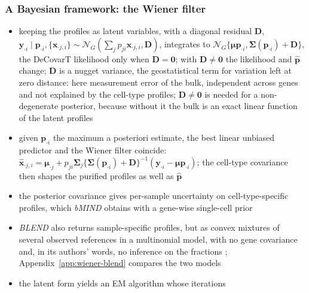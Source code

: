 \documentclass[pdflatex, sn-nature]{sn-jnl}
\theoremstyle{thmstyleone}%
\theoremstyle{thmstyletwo}%
\theoremstyle{thmstylethree}%
\begin{document}
\subsubsection{A Bayesian framework: the Wiener filter}
\label{sec:wiener}

\begin{itemize}
  \item keeping the profiles as latent variables, with a diagonal residual \(\boldsymbol{D}\),
        \(\boldsymbol{y}_{\cdot i}\mid\boldsymbol{p}_{\cdot i},\{\boldsymbol{x}_{\cdot j,i}\}\sim\mathcal{N}_{G}(\sum_{j}p_{ji}\boldsymbol{x}_{\cdot j,i},\boldsymbol{D})\),
        integrates to \(\mathcal{N}_{G}\{\boldsymbol{\mu}\boldsymbol{p}_{\cdot i},\boldsymbol{\Sigma}(\boldsymbol{p}_{\cdot i})+\boldsymbol{D}\}\), the DeCovarT likelihood only when
        \(\boldsymbol{D}=\boldsymbol{0}\); with \(\boldsymbol{D}\neq\boldsymbol{0}\) the likelihood and \(\hat{\boldsymbol{p}}\) change; \(\boldsymbol{D}\) is a nugget variance, the geostatistical term for
        variation left at zero distance: here measurement error of the bulk, independent across genes and not explained
        by the cell-type profiles; \(\boldsymbol{D}\neq\boldsymbol{0}\) is needed for a non-degenerate posterior, because without
        it the bulk is an exact linear function of the latent profiles
  \item given \(\boldsymbol{p}_{\cdot i}\) the maximum a posteriori estimate, the best linear unbiased predictor
        and the Wiener filter coincide:
        \(\hat{\boldsymbol{x}}_{\cdot j,i}=\boldsymbol{\mu}_{\cdot j}+p_{ji}\boldsymbol{\Sigma}_{j}\{\boldsymbol{\Sigma}(\boldsymbol{p}_{\cdot i})+\boldsymbol{D}\}^{-1}(\boldsymbol{y}_{\cdot i}-\boldsymbol{\mu}\boldsymbol{p}_{\cdot i})\);
        the cell-type covariance then shapes the purified profiles as well as \(\hat{\boldsymbol{p}}\)
  \item the posterior covariance gives per-sample uncertainty on cell-type-specific profiles, which
        \emph{bMIND} obtains with a gene-wise single-cell prior \cite{wangBayesianEstimationCelltypespecific2020}
  \item \emph{BLEND} also returns sample-specific profiles, but as convex mixtures of several observed references in a
        multinomial model, with no gene covariance and, in its authors' words, no inference on the fractions
        \cite{huangBLENDProbabilisticCellular2024}; Appendix~\ref{app:wiener-blend} compares the two models
  \item the latent form yields an EM algorithm \cite{dempsterMaximumLikelihoodIncomplete1977} whose iterations

\end{itemize}
\end{document}
